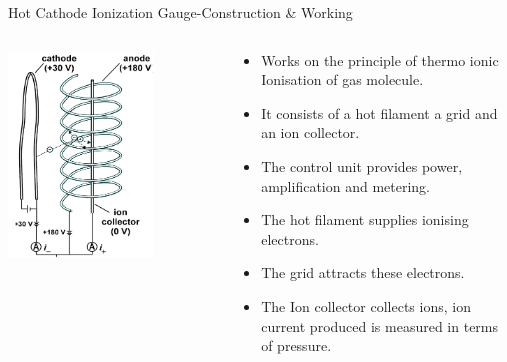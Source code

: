 \documentclass[11pt]{beamer}
\begin{document}
\begin{frame}{Hot Cathode Ionization Gauge-Construction \& Working}

\begin{columns}[t]
    
      
       \begin{exampleblock}{}
         \begin{center}
			\includegraphics[width=0.7\textwidth]{HCIG.png}
		\end{center}
       \end{exampleblock}
       
       \begin{exampleblock}{ }
          \begin{itemize}
          \item Works on the principle of thermo ionic Ionisation of gas molecule. 
          \item It consists of  a hot filament a grid and an ion collector.
          \item The control unit provides power, amplification and metering.
          \item The hot filament supplies ionising electrons.
          \item The grid attracts these electrons.
          \item The Ion collector collects ions, ion current produced is measured in terms of pressure.
          
          \end{itemize}
       
       \end{exampleblock}   
   
    \end{columns}   





\end{frame}
\end{document}
